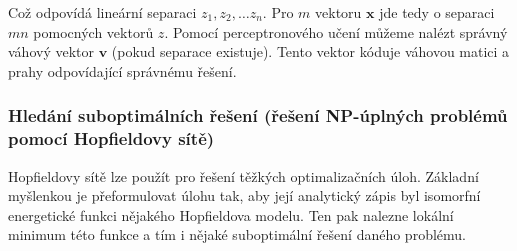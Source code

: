 \documentclass[11pt]{report} %
\renewcommand{\vec}[1]{\mathbf{#1}}
\numberwithin{equation}{section}
\begin{document}
Což odpovídá lineární separaci $z_1,z_2,\dots z_n$. Pro $m$ vektoru $\vec{x}$ jde tedy o separaci $mn$ pomocných vektorů $z$. Pomocí perceptronového učení můžeme nalézt správný váhový vektor $\vec{v}$ (pokud separace existuje). Tento vektor kóduje váhovou matici a prahy odpovídající správnému řešení.

\subsubsection{Hledání suboptimálních řešení (řešení NP-úplných problémů pomocí Hopfieldovy sítě)}
Hopfieldovy sítě lze použít pro řešení těžkých optimalizačních úloh. Základní myšlenkou je přeformulovat úlohu tak, aby její analytický zápis byl isomorfní energetické funkci nějakého Hopfieldova modelu. Ten pak nalezne lokální minimum této funkce a tím i nějaké suboptimální řešení daného problému.
\end{document}
